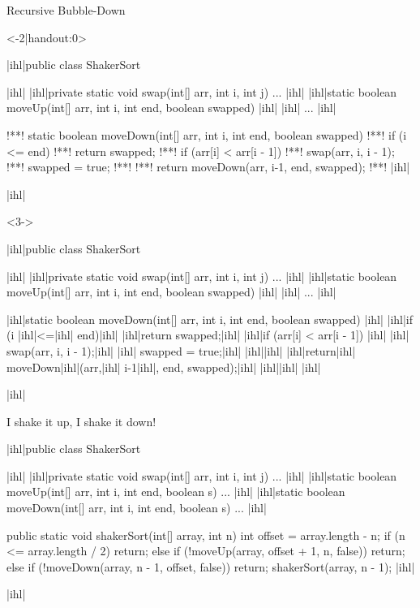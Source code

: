 \begin{frame}[c,fragile]{Recursive Bubble-Down}
\SetupLstHl
\begin{onlyenv}<-2|handout:0>
\begin{plainjava}
|ihl|public class ShakerSort {|ihl|
    |ihl|private static void swap(int[] arr, int i, int j) { ... }|ihl|
    |ihl|static boolean moveUp(int[] arr, int i, int end, boolean swapped) |ihl|
        |ihl|{ ... }|ihl|

!**!    static boolean moveDown(int[] arr, int i, int end, boolean swapped) {
!**!        if (i <= end)
!**!           return swapped;
!**!        if (arr[i] < arr[i - 1]) {
!**!           swap(arr, i, i - 1);
!**!           swapped = true;
!**!        }
!**!        return moveDown(arr, i-1, end, swapped);
!**!    }
|ihl|}|ihl|
\end{plainjava}
\end{onlyenv}
\begin{onlyenv}<3->
\begin{plainjava}
|ihl|public class ShakerSort {|ihl|
    |ihl|private static void swap(int[] arr, int i, int j) { ... }|ihl|
    |ihl|static boolean moveUp(int[] arr, int i, int end, boolean swapped) |ihl|
        |ihl|{ ... }|ihl|

    |ihl|static boolean moveDown(int[] arr, int i, int end, boolean swapped) {|ihl|
        |ihl|if (i |ihl|<=|ihl| end)|ihl|
            |ihl|return swapped;|ihl|
        |ihl|if (arr[i] < arr[i - 1]) {|ihl|
        |ihl|   swap(arr, i, i - 1);|ihl|
        |ihl|   swapped = true;|ihl|
        |ihl|}|ihl|
        |ihl|return|ihl| moveDown|ihl|(arr,|ihl| i-1|ihl|, end, swapped);|ihl|
    |ihl|}|ihl|
|ihl|}|ihl|
\end{plainjava}
\end{onlyenv}
\end{frame}

\begin{frame}[c,fragile]{I shake it up, I shake it down!}
\SetupLstHl
\begin{plainjava}
|ihl|public class ShakerSort {|ihl|
    |ihl|private static void swap(int[] arr, int i, int j) { ... }|ihl|
    |ihl|static boolean moveUp(int[] arr, int i, int end, boolean s) { ... }|ihl|
    |ihl|static boolean moveDown(int[] arr, int i, int end, boolean s) { ... }|ihl|

    public static void shakerSort(int[] array, int n) {
        int offset = array.length - n;
        if (n <= array.length / 2)
           return;
        else if (!moveUp(array, offset + 1, n, false))
           return;
        else if (!moveDown(array, n - 1, offset, false))
           return;
        shakerSort(array, n - 1);
    }
|ihl|}|ihl|
\end{plainjava}
\end{frame}

